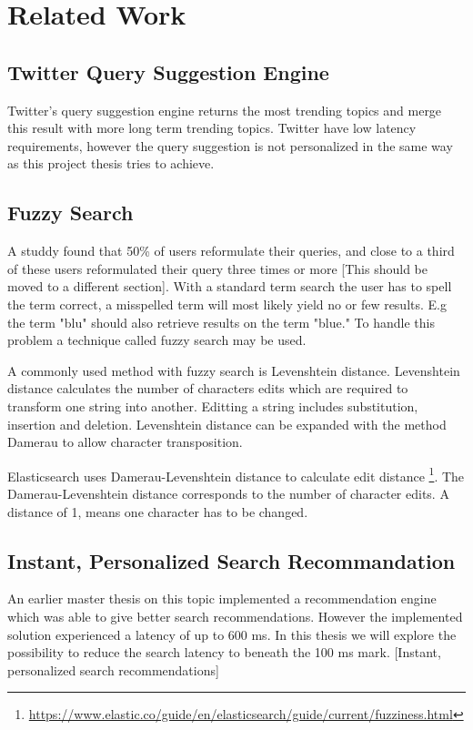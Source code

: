 \chapter{Related Work}
\label{ch:related-work}

\section{Twitter Query Suggestion Engine}

Twitter’s query suggestion engine \cite{twitter-suggestion} returns the most trending topics and merge this result with more long term trending topics.
Twitter have low latency requirements, however the query suggestion is not personalized in the same way as this project thesis tries to achieve.

\section{Fuzzy Search}
A studdy found that 50\% of users reformulate their queries, and close to a third of these users reformulated their query three times or more \cite{query-reformulate}[This should be moved to a different section].
With a standard term search the user has to spell the term correct, a misspelled term will most likely yield no or few results.
E.g the term "blu" should also retrieve results on the term "blue."
To handle this problem a technique called fuzzy search may be used.

A commonly used method with fuzzy search is Levenshtein distance.
Levenshtein distance calculates the number of characters edits which are required to transform one string into another.
Editting a string includes substitution, insertion and deletion.
Levenshtein distance can be expanded with the method Damerau to allow character transposition.

Elasticsearch uses Damerau-Levenshtein distance to calculate edit distance \footnote{\url{https://www.elastic.co/guide/en/elasticsearch/guide/current/fuzziness.html}}.
The Damerau-Levenshtein distance corresponds to the number of character edits.
A distance of 1, means one character has to be changed.

\section{Instant, Personalized Search Recommandation}
An earlier master thesis on this topic implemented a recommendation engine which was able to give better search recommendations.
However the implemented solution experienced a latency of up to 600 ms.
In this thesis we will explore the possibility to reduce the search latency to beneath the 100 ms mark. [Instant, personalized search recommendations]

